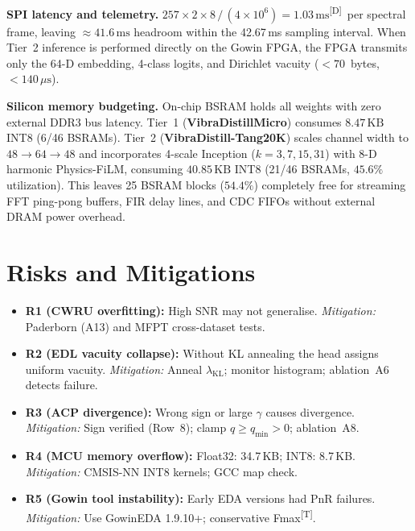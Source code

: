 \documentclass[conference]{IEEEtran}
\newcommand{\evD}{\textsuperscript{\textcolor{derived}{[D]}}\xspace}
\newcommand{\evT}{\textsuperscript{\textcolor{target}{[T]}}\xspace}
\newcommand{\VDM}{\textsf{\textbf{VibraDistillMicro}}\xspace}
\begin{document}
\textbf{SPI latency and telemetry.}\;
$257\times2\times8\,/\,(4\times10^6)=1.03\,\text{ms}$\evD\ per spectral frame,
leaving ${\approx}41.6\,\text{ms}$ headroom within the 42.67\,ms sampling interval.
When Tier~2 inference is performed directly on the Gowin FPGA, the FPGA transmits
only the 64-D embedding, 4-class logits, and Dirichlet vacuity ($<70$~bytes, $<140\,\mu\text{s}$).

\textbf{Silicon memory budgeting.}\;
On-chip BSRAM holds all weights with zero external DDR3 bus latency.
Tier~1 (\VDM) consumes $8.47\,\text{KB}$ INT8 (6/46 BSRAMs).
Tier~2 (\textsf{\textbf{VibraDistill-Tang20K}}) scales channel width to $48{\to}64{\to}48$
and incorporates 4-scale Inception ($k=3,7,15,31$) with 8-D harmonic Physics-FiLM,
consuming $40.85\,\text{KB}$ INT8 (21/46 BSRAMs, $45.6\%$ utilization).
This leaves 25 BSRAM blocks ($54.4\%$) completely free for streaming FFT ping-pong buffers,
FIR delay lines, and CDC FIFOs without external DRAM power overhead.

\section{Risks and Mitigations}
\label{sec:risks}

\begin{itemize}
  \item \textbf{R1 (CWRU overfitting):} High SNR may not generalise.
    \textit{Mitigation:} Paderborn (A13) and MFPT cross-dataset tests.
  \item \textbf{R2 (EDL vacuity collapse):} Without KL annealing the head
    assigns uniform vacuity.
    \textit{Mitigation:} Anneal $\lambda_\mathrm{KL}$; monitor
    histogram; ablation~A6 detects failure.
  \item \textbf{R3 (ACP divergence):} Wrong sign or large $\gamma$ causes
    divergence.
    \textit{Mitigation:} Sign verified (Row~8); clamp
    $q\ge q_\mathrm{min}>0$; ablation~A8.
  \item \textbf{R4 (MCU memory overflow):} Float32: 34.7\,KB; INT8: 8.7\,KB.
    \textit{Mitigation:} CMSIS-NN INT8 kernels; GCC map check.
  \item \textbf{R5 (Gowin tool instability):} Early EDA versions had PnR
    failures.
    \textit{Mitigation:} Use GowinEDA 1.9.10+; conservative Fmax\evT.
\end{itemize}

\end{document}
